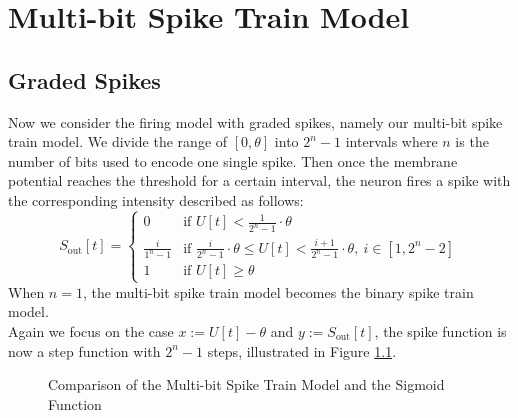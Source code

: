 \chapter{Multi-bit Spike Train Model}
\label{chap:multi-bit-spike-train-model}

\section{Graded Spikes}
\label{sec:graded-spikes}
    Now we consider the firing model with graded spikes, namely our multi-bit spike train model. We divide the range of $[0, \theta]$ into
    $2^n-1$ intervals where $n$ is the number of bits used to encode one single spike. Then once the membrane potential reaches the threshold 
    for a certain interval, the neuron fires a spike with the corresponding intensity described as follows:
    \begin{equation}
        \label{eq:multi-bit-spike}
        S_{\text{out}}[t] = \begin{cases}
            0               & \text{if } U[t] < \frac{1}{2^n-1}\cdot\theta \\
            \frac{i}{1^n-1} & \text{if } \frac{i}{2^n-1}\cdot\theta \leq U[t] < \frac{i+1}{2^n-1}\cdot\theta,\ i\in [1, 2^n-2]\\
            1               & \text{if } U[t] \geq \theta
        \end{cases}
    \end{equation}
    When $n = 1$, the multi-bit spike train model becomes the binary spike train model. \\
    Again we focus on the case $x := U[t] - \theta$ and $y := S_{\text{out}}[t]$, the spike function is now a step function with $2^n-1$ steps, illustrated in Figure \ref{fig:multi-bit-spike_sigmoid}. 
    \begin{figure}[!htpb]
        \centering
        \caption{Comparison of the Multi-bit Spike Train Model and the Sigmoid Function}
        \label{fig:multi-bit-spike_sigmoid}
    \end{figure}

